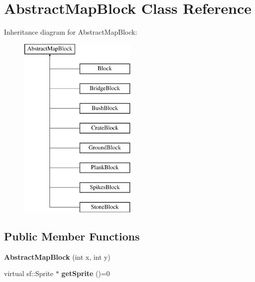 \hypertarget{class_abstract_map_block}{}\section{Abstract\+Map\+Block Class Reference}
\label{class_abstract_map_block}
Inheritance diagram for Abstract\+Map\+Block\+:\begin{figure}[H]
\begin{center}
\leavevmode
\includegraphics[height=9.000000cm]{class_abstract_map_block}
\end{center}
\end{figure}
\subsection*{Public Member Functions}
\begin{DoxyCompactItemize}
\item 
\mbox{\label{class_abstract_map_block_afea0f904a49f56b417387f721c8677c9}} 
{\bfseries Abstract\+Map\+Block} (int x, int y)
\item 
\mbox{\label{class_abstract_map_block_ab5a448a1b6478d10a8814c6d19c4fdb4}} 
virtual sf\+::\+Sprite $\ast$ {\bfseries get\+Sprite} ()=0
\end{DoxyCompactItemize}

